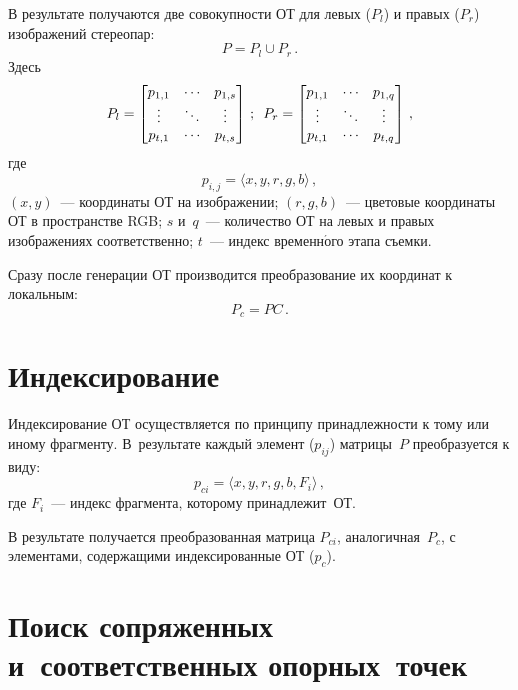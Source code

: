 \begin{multicols}{2}
  В результате получаются две совокупности ОТ для левых ($P_l$) и правых 
($P_r$) изображений стереопар:
  \begin{equation*}
  P=P_l\cup P_r\,.
  \end{equation*} 
  Здесь
  \begin{equation*}
  P_l=\begin{bmatrix}
  p_{1,1} &\cdots & p_{1,s}\\
  \vdots & \ddots & \vdots\\
  p_{t,1} & \cdots & p_{t,s}
  \end{bmatrix}\,;\enskip P_r= \begin{bmatrix}
  p_{1,1} &\cdots & p_{1,q}\\
  \vdots & \ddots & \vdots\\
  p_{t,1} & \cdots & p_{t,q}
  \end{bmatrix}\,,
  \end{equation*}
  где
$$
  p_{i,j} =\langle x, y, r, g ,b\rangle\,,
$$
$(x, y)$~--- координаты ОТ на изображении;
$(r, g, b)$~--- цветовые координаты ОТ в пространстве RGB;
$s$ и~$q$~--- количество ОТ на левых и правых изоб\-ра\-же\-ни\-ях соответственно;
$t$~--- индекс временн$\acute{\mbox{о}}$го этапа съемки.
  
  Сразу после генерации ОТ производится преобразование их координат к 
локальным:
  $$
  P_c=PC\,.
  $$
  
\vspace*{-18pt}

\section{Индексирование}
  
  Индексирование ОТ осуществляется по принципу принадлежности к тому 
или иному фрагменту. В~результате каждый элемент ($p_{ij}$) матрицы~$P$ 
преобразуется к виду:
  $$
p_{ci} = \langle x, y, r, g, b, F_i\rangle\,,
$$
где $F_i$~--- индекс фрагмента, которому принадлежит~ОТ.
  
  В результате получается преобразованная мат\-ри\-ца $P_{ci}$, 
аналогичная~$P_c$, с элементами, содержащими индексированные ОТ ($p_c$).


\vspace*{-9pt}

\section{Поиск сопряженных и~соответственных опорных~точек}
  

\end{multicols}
